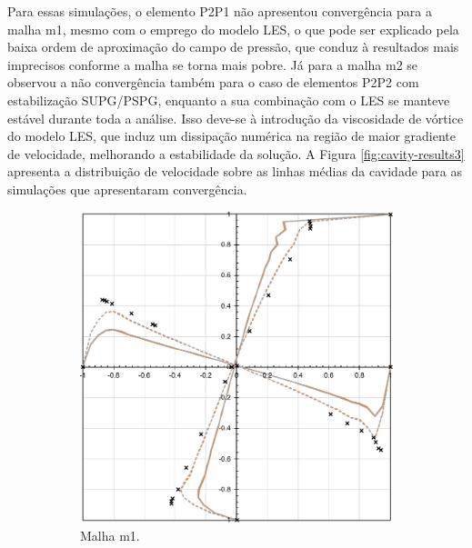Para essas simulações, o elemento P2P1 não apresentou convergência para a malha m1, mesmo com o emprego do modelo LES, o que pode ser explicado pela baixa ordem de aproximação do campo de pressão, que conduz à resultados mais imprecisos conforme a malha se torna mais pobre. Já para a malha m2 se observou a não convergência também para o caso de elementos P2P2 com estabilização SUPG/PSPG, enquanto a sua combinação com o LES se manteve estável durante toda a análise. Isso deve-se à introdução da viscosidade de vórtice do modelo LES, que induz um dissipação numérica na região de maior gradiente de velocidade, melhorando a estabilidade da solução. A Figura \ref{fig:cavity-results3} apresenta a distribuição de velocidade sobre as linhas médias da cavidade para as simulações que apresentaram convergência.

\begin{figure}[h!]
    \centering
    \caption{Cavidade bidimensional - Valores do campo de velocidade sobre as linhas médias para as malhas m1 e m2.}
    \begin{subfigure}{0.49\textwidth}
        \includegraphics[width=\linewidth]{Figuras/Cavity/res-m1.pdf}
        \caption{Malha m1.}
    \end{subfigure}
    \begin{subfigure}{0.49\textwidth}

\end{subfigure}
\end{figure}
